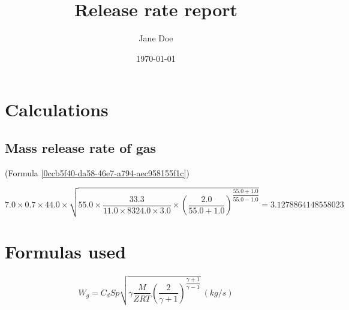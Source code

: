 \documentclass[12pt, letterpaper]{article}
\title{Release rate report}
\author{Jane Doe}
\date{\today}
\begin{document}
    \begin{titlepage}
    \maketitle
    \thispagestyle{empty}
    \end{titlepage}
    \section{Calculations}
    \subsection{Mass release rate of gas}
    (Formula \ref{0ccb5f40-da58-46e7-a794-aec958155f1c})
    \hfill \break
    \par
    \begin{flushleft}
    $ 7.0 \times 0.7 \times 44.0 \times \sqrt{55.0 \times \dfrac{33.3}{11.0 \times 8324.0 \times 3.0} \times {\left({\dfrac{2.0}{55.0 + 1.0}}\right)}^{\dfrac{55.0 + 1.0}{55.0 - 1.0}}} = 3.1278864148558023 $
    \end{flushleft}
    \pagebreak
    \section{Formulas used}
    \paragraph{}
    \begin{equation} \label{0ccb5f40-da58-46e7-a794-aec958155f1c}
    W_g = C_d S p \sqrt{  \gamma  \dfrac{M}{ZRT} \left( { \dfrac{2}{ \gamma  + 1} } \right) ^ { \dfrac{ \gamma  + 1}{ \gamma  - 1} } }\ (kg/s)
    \end{equation}
    \newline
    
\end{document}
